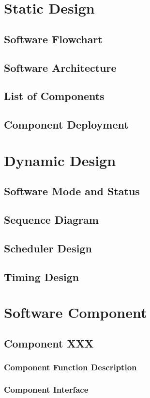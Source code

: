 \documentclass[11pt,letterpaper]{report}
\begin{document}
\chapter{Static Design}
\section{Software Flowchart}
\section{Software Architecture}
\section{List of Components}
\section{Component Deployment}

\chapter{Dynamic Design}
\section{Software Mode and Status}
\section{Sequence Diagram}
\section{Scheduler Design}
\section{Timing Design}

\chapter{Software Component}
\section{Component XXX}
\subsection{Component Function Description}
\subsection{Component Interface}
\end{document}

